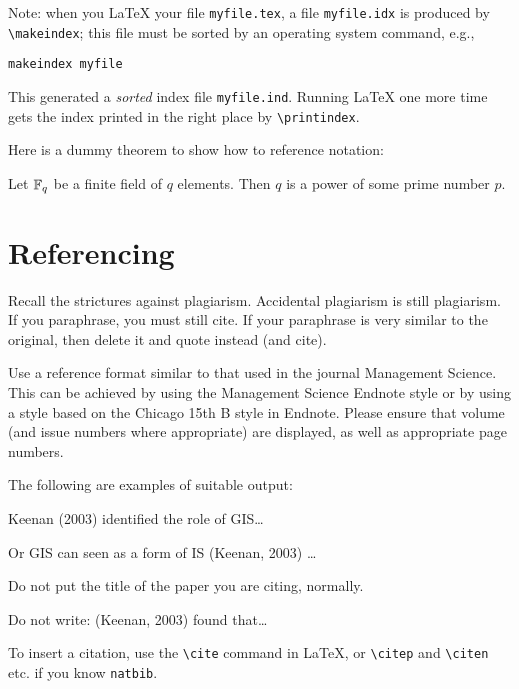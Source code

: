Note: when you LaTeX your file \texttt{myfile.tex}, a file \texttt{myfile.idx} is produced by \verb|\makeindex|;
this file must be sorted by an operating system command, e.g.,

\texttt{makeindex myfile}

This generated a \emph{sorted} index file \texttt{myfile.ind}.  Running LaTeX one more time gets the index printed
in the right place by \verb|\printindex|.

Here is a dummy theorem to show how to reference notation:
\begin{thm}\label{Th.FF.fte.field}
Let $\mathbb{F}_q$ be a finite field of $q$ elements.  Then $q$ is a power of some prime number $p$.
\end{thm}


\section{Referencing}

Recall the strictures against plagiarism. Accidental plagiarism is still plagiarism. If you paraphrase, you must still cite. If your paraphrase is very similar to the original, then delete it and quote instead (and cite).

Use a reference format similar to that used in the journal Management Science. This can be achieved by using the Management Science Endnote style or by using a style based on the Chicago 15th B style in Endnote.  Please ensure that volume (and issue numbers where appropriate) are displayed, as well as appropriate page numbers.

The following are examples of suitable output:

Keenan (2003) identified the role of GIS\ldots

Or GIS can seen as a form of IS (Keenan, 2003) \dots

Do not put the title of the paper you are citing, normally.

Do not write: (Keenan, 2003) found that\ldots

To insert a citation, use the \verb+\cite+ command in LaTeX, or \verb+\citep+ and \verb+\citen+ etc. if you know \verb+natbib+.
